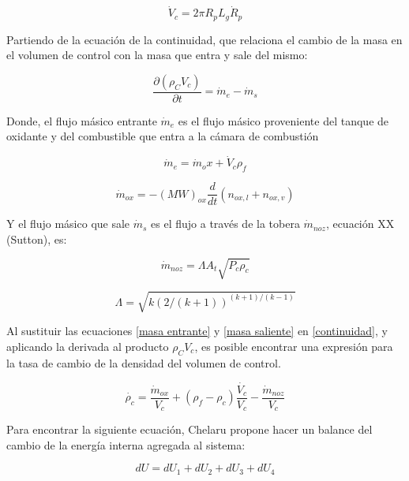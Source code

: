 \documentclass[12pt]{article}
\begin{document}
\begin{equation}
  \dot{V}_{c} = 2 \pi R_{p} L_{g} \dot{R}_{p}
  \label{vol dot}
\end{equation}

Partiendo de la ecuación de la continuidad, que relaciona el cambio de la masa en el volumen de control con la masa que entra y sale del mismo:

\begin{equation}
  \frac{\partial (\rho_C V_{c})}{\partial t} = \dot{m}_e - \dot{m}_s
  \label{continuidad}
\end{equation}

Donde, el flujo másico entrante $\dot{m}_{e}$ es el flujo másico proveniente del tanque de oxidante y del combustible que entra a la cámara de combustión

\begin{equation}
  \dot{m}_{e} = \dot{m}_ox + \dot{V}_{c} \rho_f
  \label{masa entrante}
\end{equation}

\begin{equation}
  \dot{m}_{ox} = - (MW)_{ox} \frac{d}{dt}(n_{ox,l}+n_{ox,v})
\end{equation}

Y el flujo másico que sale $\dot{m}_{s}$ es el flujo a través de la tobera $\dot{m}_{noz}$, ecuación XX (Sutton), es:

\begin{equation}
  \dot{m}_{noz} = \Lambda A_{t} \sqrt{P_{c} \rho_{c}}
  \label{masa saliente}
\end{equation}

\begin{equation}
  \Lambda = \sqrt{k(2 /(k+1))^{(k+1) /(k-1)}}
\end{equation}

Al sustituir las ecuaciones \ref{masa entrante} y \ref{masa saliente} en \ref{continuidad}, y aplicando la derivada al producto $\rho_C V_{c}$, es posible encontrar una expresión para la tasa de cambio de la densidad del volumen de control.

\begin{equation}
  \dot{\rho_{c}}=\frac{\dot{m}_{ox}}{V_{c}}+\left(\rho_{f}-\rho_{c}\right) \frac{\dot{V_{c}}}{V_{c}}-\frac{\dot{m}_{noz}}{V_{c}}
\end{equation}

Para encontrar la siguiente ecuación, Chelaru propone hacer un balance del cambio de la energía interna agregada al sistema:

\begin{equation}
  d U=d U_{1}+d U_{2}+d U_{3}+d U_{4}
  \label{energia interna}
\end{equation}
\end{document}
